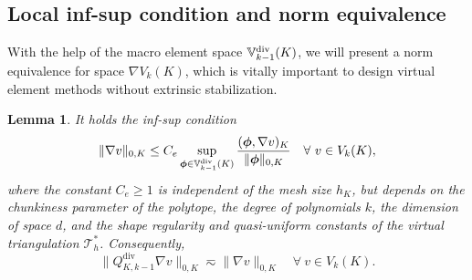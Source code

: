 \documentclass[10pt]{amsart}
\newtheorem{lemma}[theorem]{Lemma}
\renewcommand{\div}{\operatorname{div}}
\numberwithin{equation}{section}
\begin{document}
\subsection{Local inf-sup condition and norm equivalence}
With the help of the macro element space $\mathbb{V}_{k-1}^{\rm div}(K)$, we will present a norm equivalence for space $\nabla V_k(K)$, which is vitally important to design virtual element methods without extrinsic stabilization. 
\begin{lemma}\label{lem:gradVknormequivalence}
It holds the inf-sup condition
\begin{equation}\label{eq:localdiscreteinfsup}    
\|\nabla v\|_{0,K}\leq C_e\sup_{\boldsymbol{\phi}\in\mathbb{V}_{k-1}^{\rm div}(K)}\frac{(\boldsymbol{\phi}, \nabla v)_K}{\|\boldsymbol{\phi}\|_{0,K}} \quad \forall~v\in V_k(K),
\end{equation}
where the constant $C_e\geq1$ is independent of the mesh size $h_K$, but depends on the chunkiness parameter of the polytope, the degree of polynomials $k$, the dimension of space $d$, and the shape regularity and quasi-uniform constants of the virtual triangulation $\mathcal T^*_h$.
Consequently,
\begin{equation}\label{eq:gradVknormequivalence}  
\|Q_{K,k-1}^{\div}\nabla v\|_{0,K}\eqsim \|\nabla v\|_{0,K} \quad \forall~v\in V_k(K).
\end{equation}
\end{lemma}
\end{document}
